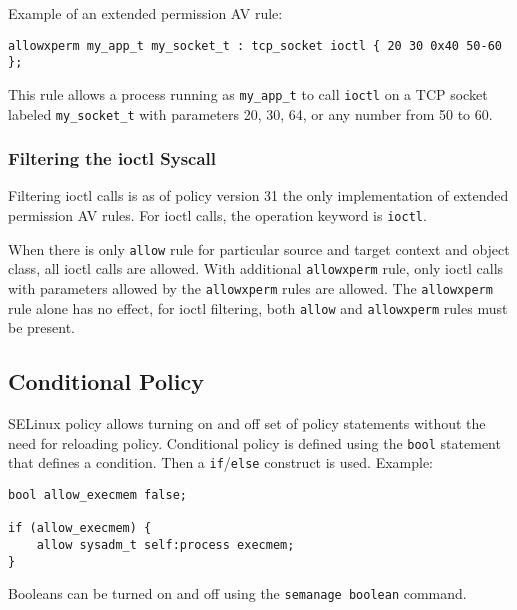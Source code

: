Example of an extended permission AV rule:
\begin{lstlisting}
allowxperm my_app_t my_socket_t : tcp_socket ioctl { 20 30 0x40 50-60 };
\end{lstlisting}
This rule allows a process running as \texttt{my\_app\_t} to call \texttt{ioctl}
on a TCP socket labeled \texttt{my\_socket\_t} with parameters 20, 30, 64, or
any number from 50 to 60.

\subsubsection{Filtering the ioctl Syscall}
Filtering ioctl calls is as of policy version 31 the only implementation of
extended permission AV rules. For ioctl calls, the operation keyword is
\texttt{ioctl}.

When there is only \texttt{allow} rule for particular source and target context
and object class, all ioctl calls are allowed. With additional
\texttt{allowxperm} rule, only ioctl calls with parameters allowed by the
\texttt{allowxperm} rules are allowed. The \texttt{allowxperm} rule alone has
no effect, for ioctl filtering, both \texttt{allow} and \texttt{allowxperm}
rules must be present.

\subsection{Conditional Policy}

SELinux policy allows turning on and off set of policy statements without the
need for reloading policy. Conditional policy is defined using the \texttt{bool}
statement that defines a condition. Then a \texttt{if}/\texttt{else} construct
is used. Example:
\begin{lstlisting}
bool allow_execmem false;

if (allow_execmem) {
    allow sysadm_t self:process execmem;
}
\end{lstlisting}
Booleans can be turned on and off using the \texttt{semanage boolean} command.

